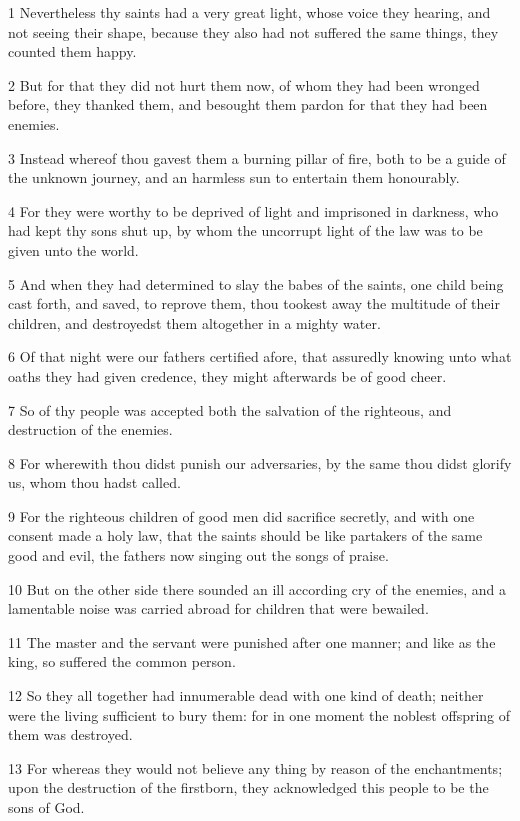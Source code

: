 \par 1 Nevertheless thy saints had a very great light, whose voice they hearing, and not seeing their shape, because they also had not suffered the same things, they counted them happy.
\par 2 But for that they did not hurt them now, of whom they had been wronged before, they thanked them, and besought them pardon for that they had been enemies.
\par 3 Instead whereof thou gavest them a burning pillar of fire, both to be a guide of the unknown journey, and an harmless sun to entertain them honourably.
\par 4 For they were worthy to be deprived of light and imprisoned in darkness, who had kept thy sons shut up, by whom the uncorrupt light of the law was to be given unto the world.
\par 5 And when they had determined to slay the babes of the saints, one child being cast forth, and saved, to reprove them, thou tookest away the multitude of their children, and destroyedst them altogether in a mighty water.
\par 6 Of that night were our fathers certified afore, that assuredly knowing unto what oaths they had given credence, they might afterwards be of good cheer.
\par 7 So of thy people was accepted both the salvation of the righteous, and destruction of the enemies.
\par 8 For wherewith thou didst punish our adversaries, by the same thou didst glorify us, whom thou hadst called.
\par 9 For the righteous children of good men did sacrifice secretly, and with one consent made a holy law, that the saints should be like partakers of the same good and evil, the fathers now singing out the songs of praise.
\par 10 But on the other side there sounded an ill according cry of the enemies, and a lamentable noise was carried abroad for children that were bewailed.
\par 11 The master and the servant were punished after one manner; and like as the king, so suffered the common person.
\par 12 So they all together had innumerable dead with one kind of death; neither were the living sufficient to bury them: for in one moment the noblest offspring of them was destroyed.
\par 13 For whereas they would not believe any thing by reason of the enchantments; upon the destruction of the firstborn, they acknowledged this people to be the sons of God.
